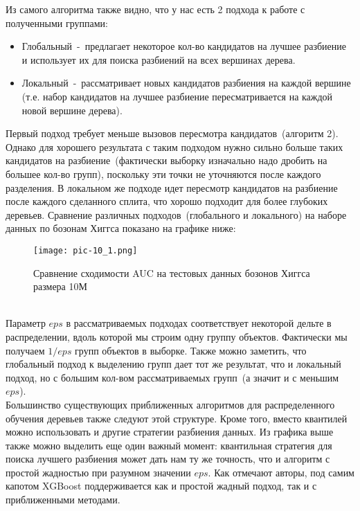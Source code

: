 \documentclass[12pt,fleqn]{article}
\begin{document}
\vspace{5pt}
\hline
\vspace{5pt}
Из самого алгоритма также видно, что у нас есть 2 подхода к работе с полученными группами:
\begin{itemize}
	\item Глобальный~-~предлагает некоторое кол-во кандидатов на лучшее разбиение и использует их для поиска разбиений на всех вершинах дерева.
	\item Локальный~-~рассматривает новых кандидатов разбиения на каждой вершине (т.е. набор кандидатов на лучшее разбиение пересматривается на каждой новой вершине дерева). 
\end{itemize}

Первый подход требует меньше вызовов пересмотра кандидатов~(алгоритм 2). Однако для хорошего результата с таким подходом нужно сильно больше таких кандидатов на разбиение~(фактически выборку изначально надо дробить на большее кол-во групп), поскольку эти точки не уточняются после каждого разделения. В локальном же подходе идет пересмотр кандидатов на разбиение после каждого сделанного сплита, что хорошо подходит для более глубоких деревьев. Сравнение различных подходов~(глобального и локального) на наборе данных по бозонам Хиггса показано на графике ниже:
\begin{figure}[h]
	\centering
	\texttt{[image: pic-10\_1.png]}
	\caption{Сравнение сходимости AUC на тестовых данных бозонов Хиггса размера 10М}
	\label{fig:terms}
\end{figure}\\
Параметр $eps$ в рассматриваемых подходах соответствует некоторой дельте в распределении, вдоль которой мы строим одну группу объектов. Фактически мы получаем $1 / eps$ групп объектов в выборке. Также можно заметить, что глобальный подход к выделению групп дает тот же результат, что и локальный подход, но с большим кол-вом рассматриваемых групп~(а значит и с меньшим $eps$).\\

Большинство существующих приближенных алгоритмов для распределенного обучения деревьев также следуют этой структуре. Кроме того, вместо квантилей можно использовать и другие стратегии разбиения данных. Из графика выше также можно выделить еще один важный момент: квантильная стратегия для поиска лучшего разбиения может дать нам ту же точность, что и алгоритм с простой жадностью при разумном значении $eps$. Как отмечают авторы, под самим капотом XGBoost поддерживается как и простой жадный подход, так и с приближенными методами.
\end{document}
